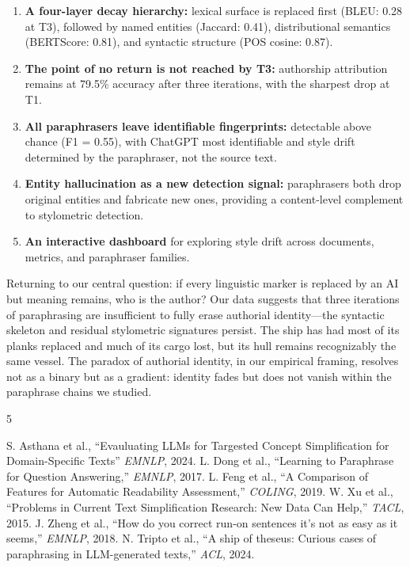 \documentclass[10pt,twocolumn]{article}
\begin{document}
\begin{enumerate}[leftmargin=*,topsep=2pt,itemsep=1pt]
  \item \textbf{A four-layer decay hierarchy:} lexical surface is
    replaced first (BLEU: 0.28 at T3), followed by named entities
    (Jaccard: 0.41), distributional semantics (BERTScore: 0.81), and
    syntactic structure (POS cosine: 0.87).
  \item \textbf{The point of no return is not reached by T3:}
    authorship attribution remains at 79.5\% accuracy after three
    iterations, with the sharpest drop at T1.
  \item \textbf{All paraphrasers leave identifiable fingerprints:}
    detectable above chance (F1 = 0.55), with ChatGPT most identifiable
    and style drift determined by the paraphraser, not the source text.
  \item \textbf{Entity hallucination as a new detection signal:}
    paraphrasers both drop original entities and fabricate new ones,
    providing a content-level complement to stylometric detection.
  \item \textbf{An interactive dashboard} for exploring style drift
    across documents, metrics, and paraphraser families.
\end{enumerate}

\noindent Returning to our central question: if every linguistic marker
is replaced by an AI but meaning remains, who is the author? Our data
suggests that three iterations of paraphrasing are insufficient to fully
erase authorial identity---the syntactic skeleton and residual stylometric
signatures persist. The ship has had most of its planks replaced and
much of its cargo lost, but its hull remains recognizably the same vessel.
The paradox of authorial identity, in our empirical framing, resolves
not as a binary but as a gradient: identity fades but does not vanish
within the paraphrase chains we studied.

\begin{thebibliography}{5}

\small

 S. Asthana et al., ``Evauluating LLMs for Targested Concept Simplification for Domain-Specific Texts'' \textit{EMNLP}, 2024.
 L. Dong et al., ``Learning to Paraphrase for Question Answering,'' \textit{EMNLP}, 2017.
 L. Feng et al., ``A Comparison of Features for Automatic Readability Assessment,'' \textit{COLING}, 2019.
 W. Xu et al., ``Problems in Current Text Simplification Research:
New Data Can Help,'' \textit{TACL}, 2015.
 J. Zheng et al., ``How do you correct run-on sentences it's not as easy as it seems,'' \textit{EMNLP}, 2018.
 N. Tripto et al., ``A ship of theseus: Curious cases of paraphrasing in LLM-generated texts,'' \textit{ACL}, 2024.

\end{thebibliography}
\end{document}
